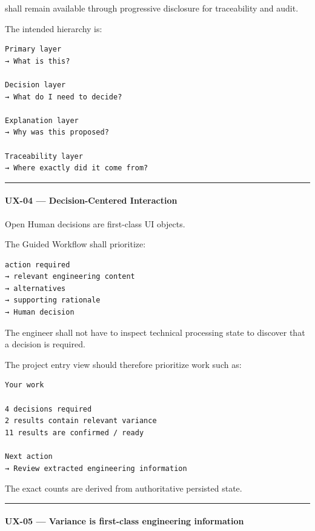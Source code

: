 shall remain available through progressive disclosure for traceability and audit.

The intended hierarchy is:

\begin{verbatim}
Primary layer
→ What is this?

Decision layer
→ What do I need to decide?

Explanation layer
→ Why was this proposed?

Traceability layer
→ Where exactly did it come from?
\end{verbatim}

\begin{center}\rule{0.5\linewidth}{0.5pt}\end{center}

\hypertarget{ux-04--decision-centered-interaction}{%
\paragraph{UX-04 --- Decision-Centered Interaction}\label{ux-04--decision-centered-interaction}}

Open Human decisions are first-class UI objects.

The Guided Workflow shall prioritize:

\begin{verbatim}
action required
→ relevant engineering content
→ alternatives
→ supporting rationale
→ Human decision
\end{verbatim}

The engineer shall not have to inspect technical processing state to discover that a decision is required.

The project entry view should therefore prioritize work such as:

\begin{verbatim}
Your work

4 decisions required
2 results contain relevant variance
11 results are confirmed / ready

Next action
→ Review extracted engineering information
\end{verbatim}

The exact counts are derived from authoritative persisted state.

\begin{center}\rule{0.5\linewidth}{0.5pt}\end{center}

\hypertarget{ux-05--variance-is-first-class-engineering-information}{%
\paragraph{UX-05 --- Variance is first-class engineering information}\label{ux-05--variance-is-first-class-engineering-information}}

